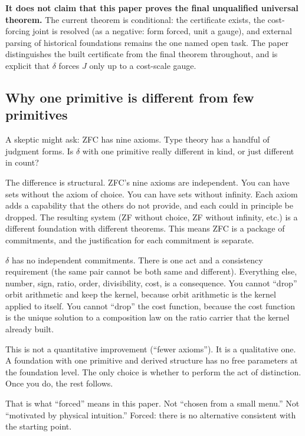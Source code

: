 \documentclass[11pt,a4paper]{article}
\theoremstyle{definition}
\theoremstyle{remark}
\begin{document}
\textbf{It does not claim that this paper proves the final unqualified
universal theorem.} The current theorem is conditional: the certificate exists,
the cost-forcing joint is resolved (as a negative: form forced, unit a gauge),
and external parsing of historical foundations remains the one named open task.
The paper distinguishes the built certificate from the final theorem throughout,
and is explicit that $\delta$ forces $J$ only up to a cost-scale gauge.

\subsection{Why one primitive is different from few primitives}

A skeptic might ask: ZFC has nine axioms. Type theory has a handful of
judgment forms. Is $\delta$ with one primitive really different in kind, or
just different in count?

The difference is structural. ZFC's nine axioms are independent. You can
have sets without the axiom of choice. You can have sets without infinity.
Each axiom adds a capability that the others do not provide, and each
could in principle be dropped. The resulting system (ZF without choice, ZF
without infinity, etc.) is a different foundation with different theorems.
This means ZFC is a package of commitments, and the justification for each
commitment is separate.

$\delta$ has no independent commitments. There is one act and a consistency
requirement (the same pair cannot be both same and different). Everything
else, number, sign, ratio, order, divisibility, cost, is a consequence.
You cannot ``drop'' orbit arithmetic and keep the kernel, because orbit
arithmetic is the kernel applied to itself. You cannot ``drop'' the cost
function, because the cost function is the unique solution to a
composition law on the ratio carrier that the kernel already built.

This is not a quantitative improvement (``fewer axioms''). It is a
qualitative one. A foundation with one primitive and derived structure has
no free parameters at the foundation level. The only choice is whether to
perform the act of distinction. Once you do, the rest follows.

That is what ``forced'' means in this paper. Not ``chosen from a small
menu.'' Not ``motivated by physical intuition.'' Forced: there is no
alternative consistent with the starting point.

\end{document}

